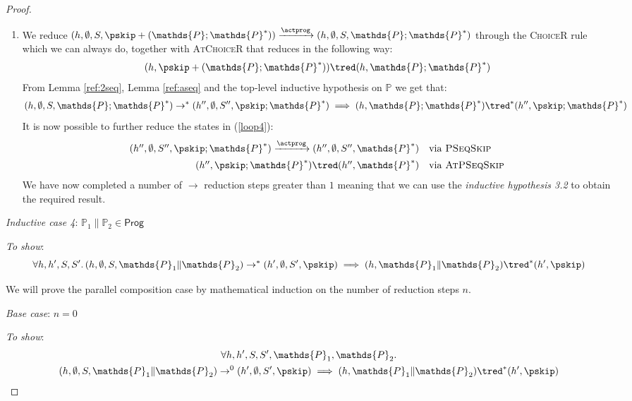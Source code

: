 \begin{thm}
{\begin{proof}
\begin{enumerate}
	\item We reduce $(h, \emptyset, S, \pskip + (\mathds{P} ; \mathds{P}^*)) \xrightarrow{\actprog} (h, \emptyset, S, \mathds{P} ; \mathds{P}^*)$ through the \textsc{ChoiceR} rule which we can always do, together with \textsc{AtChoiceR} that reduces in the following way:
	\[
		(h, \pskip + (\mathds{P} ; \mathds{P}^*)) \tred (h, \mathds{P} ; \mathds{P}^*)
	\]
	From Lemma \ref{ref:2seq}, Lemma \ref{ref:aseq} and the top-level inductive hypothesis on $\mathds{P}$ we get that:
	\begin{gather}
		\label{loop4}
		(h, \emptyset, S, \mathds{P} ; \mathds{P}^*) \rightarrow^* (h'', \emptyset, S'', \pskip ; \mathds{P}^*) \implies (h, \mathds{P} ; \mathds{P}^*) \tred^* (h'', \pskip ; \mathds{P}^*)
	\end{gather}
	It is now possible to further reduce the states in (\ref{loop4}):
	\[
		\begin{array}{r l}
			(h'', \emptyset, S'', \pskip ; \mathds{P}^*) \xrightarrow{\actprog} (h'', \emptyset, S'', \mathds{P}^*)
			&
			\text{via \textsc{PSeqSkip}}
			\\[0.5em]
			(h'', \pskip ; \mathds{P}^*) \tred (h'', \mathds{P}^*)
			&
			\text{via \textsc{AtPSeqSkip}}
		\end{array}
	\]
	We have now completed a number of $\rightarrow$ reduction steps greater than $1$ meaning that we can use the \textit{inductive hypothesis 3.2} to obtain the required result. \\
\end{enumerate}

\textit{Inductive case 4}: $\mathds{P}_1 \| \mathds{P}_2 \in \mathsf{Prog}$

\textit{To show}:
\[
	\forall h, h', S, S' \ldotp
	(h, \emptyset, S, \mathds{P}_1 \| \mathds{P}_2) \rightarrow^* (h', \emptyset, S', \pskip) \implies 
	(h, \mathds{P}_1 \| \mathds{P}_2 ) \tred^* (h', \pskip)
\]

We will prove the parallel composition case by mathematical induction on the number of reduction steps $n$.

\textit{Base case}: $n = 0$

\textit{To show}:
\begin{gather*}
	\forall h, h', S, S', \mathds{P}_1, \mathds{P}_2 \ldotp \\
	(h, \emptyset, S, \mathds{P}_1 \| \mathds{P}_2) \rightarrow^0 (h', \emptyset, S', \pskip)
	\implies
	(h, \mathds{P}_1 \| \mathds{P}_2) \tred^* (h', \pskip)
\end{gather*}


\end{proof}}
\end{thm}
